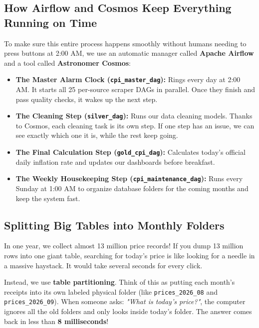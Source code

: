 \documentclass[11pt,a4paper,oneside]{article}
\begin{document}
\subsection{How Airflow and Cosmos Keep Everything Running on Time}
To make sure this entire process happens smoothly without humans needing to press buttons at 2:00 AM, we use an automatic manager called \textbf{Apache Airflow} and a tool called \textbf{Astronomer Cosmos}:
\begin{itemize}
    \item \textbf{The Master Alarm Clock (\texttt{cpi\_master\_dag}):} Rings every day at 2:00 AM. It starts all 25 per-source scraper DAGs in parallel. Once they finish and pass quality checks, it wakes up the next step.
    \item \textbf{The Cleaning Step (\texttt{silver\_dag}):} Runs our data cleaning models. Thanks to Cosmos, each cleaning task is its own step. If one step has an issue, we can see exactly which one it is, while the rest keep going.
    \item \textbf{The Final Calculation Step (\texttt{gold\_cpi\_dag}):} Calculates today's official daily inflation rate and updates our dashboards before breakfast.
    \item \textbf{The Weekly Housekeeping Step (\texttt{cpi\_maintenance\_dag}):} Runs every Sunday at 1:00 AM to organize database folders for the coming months and keep the system fast.
\end{itemize}

\subsection{Splitting Big Tables into Monthly Folders}
In one year, we collect almost 13 million price records! If you dump 13 million rows into one giant table, searching for today's price is like looking for a needle in a massive haystack. It would take several seconds for every click.

Instead, we use \textbf{table partitioning}. Think of this as putting each month's receipts into its own labeled physical folder (like \texttt{prices\_2026\_08} and \texttt{prices\_2026\_09}). When someone asks: \textit{"What is today's price?"}, the computer ignores all the old folders and only looks inside today's folder. The answer comes back in less than \textbf{8 milliseconds}!

\newpage

\end{document}
